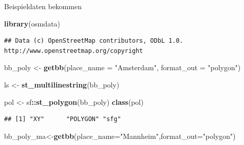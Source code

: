 \documentclass[ignorenonframetext,]{beamer}
\newenvironment{Shaded}{\begin{snugshade}}{\end{snugshade}}
\newcommand{\KeywordTok}[1]{\textcolor[rgb]{0.13,0.29,0.53}{\textbf{#1}}}
\newcommand{\DataTypeTok}[1]{\textcolor[rgb]{0.13,0.29,0.53}{#1}}
\newcommand{\StringTok}[1]{\textcolor[rgb]{0.31,0.60,0.02}{#1}}
\newcommand{\OperatorTok}[1]{\textcolor[rgb]{0.81,0.36,0.00}{\textbf{#1}}}
\newcommand{\NormalTok}[1]{#1}
\begin{document}
\begin{frame}[fragile]{Beispieldaten bekommen}

\begin{Shaded}
\begin{Highlighting}[]
\KeywordTok{library}\NormalTok{(osmdata)}
\end{Highlighting}
\end{Shaded}

\begin{verbatim}
## Data (c) OpenStreetMap contributors, ODbL 1.0. http://www.openstreetmap.org/copyright
\end{verbatim}

\begin{Shaded}
\begin{Highlighting}[]
\NormalTok{bb_poly <-}\StringTok{ }\KeywordTok{getbb}\NormalTok{(}\DataTypeTok{place_name =} \StringTok{"Amsterdam"}\NormalTok{, }
                 \DataTypeTok{format_out =} \StringTok{"polygon"}\NormalTok{)}
\end{Highlighting}
\end{Shaded}

\begin{Shaded}
\begin{Highlighting}[]
\NormalTok{ls <-}\StringTok{ }\KeywordTok{st_multilinestring}\NormalTok{(bb_poly)}
\end{Highlighting}
\end{Shaded}

\begin{Shaded}
\begin{Highlighting}[]
\NormalTok{pol <-}\StringTok{ }\NormalTok{sf}\OperatorTok{::}\KeywordTok{st_polygon}\NormalTok{(bb_poly)}
\KeywordTok{class}\NormalTok{(pol)}
\end{Highlighting}
\end{Shaded}

\begin{verbatim}
## [1] "XY"      "POLYGON" "sfg"
\end{verbatim}

\begin{Shaded}
\begin{Highlighting}[]
\NormalTok{bb_poly_ma<-}\KeywordTok{getbb}\NormalTok{(}\DataTypeTok{place_name=}\StringTok{"Mannheim"}\NormalTok{,}\DataTypeTok{format_out=}\StringTok{"polygon"}\NormalTok{)}
\end{Highlighting}
\end{Shaded}

\end{frame}
\end{document}
